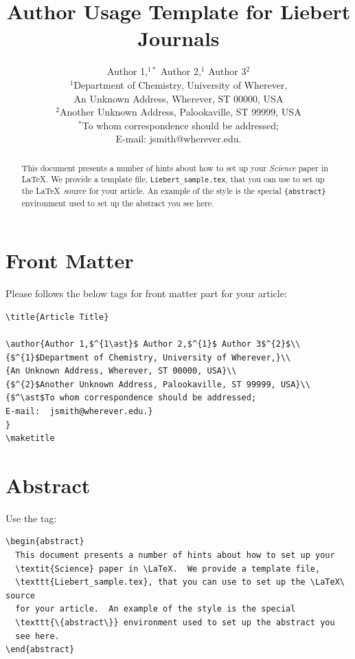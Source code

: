 \documentclass[]{Liebert_Author}
\title{Author Usage Template for Liebert Journals}
\author{Author 1,$^{1\ast}$ Author 2,$^{1}$ Author 3$^{2}$\\
{$^{1}$Department of Chemistry, University of Wherever,}\\
{An Unknown Address, Wherever, ST 00000, USA}\\
{$^{2}$Another Unknown Address, Palookaville, ST 99999, USA}\\
{$^\ast$To whom correspondence should be addressed;}\\
{E-mail:  jsmith@wherever.edu.}
}
\begin{document}
 

\maketitle 



\begin{abstract}
  This document presents a number of hints about how to set up your
  \textit{Science} paper in \LaTeX.  We provide a template file,
  \texttt{Liebert\_sample.tex}, that you can use to set up the \LaTeX\ source
  for your article.  An example of the style is the special
  \texttt{\{abstract\}} environment used to set up the abstract you
  see here.
\end{abstract}

\section{Front Matter}

Please follows the below tags for front matter part for your article:

\begin{verbatim}
\title{Article Title} 

\author{Author 1,$^{1\ast}$ Author 2,$^{1}$ Author 3$^{2}$\\
{$^{1}$Department of Chemistry, University of Wherever,}\\
{An Unknown Address, Wherever, ST 00000, USA}\\
{$^{2}$Another Unknown Address, Palookaville, ST 99999, USA}\\
{$^\ast$To whom correspondence should be addressed;
E-mail:  jsmith@wherever.edu.}
}
\maketitle
\end{verbatim}

\section{Abstract}

Use the tag:

\begin{verbatim}
\begin{abstract}
  This document presents a number of hints about how to set up your
  \textit{Science} paper in \LaTeX.  We provide a template file,
  \texttt{Liebert_sample.tex}, that you can use to set up the \LaTeX\ source
  for your article.  An example of the style is the special
  \texttt{\{abstract\}} environment used to set up the abstract you
  see here.
\end{abstract}
\end{verbatim}
\end{document}
